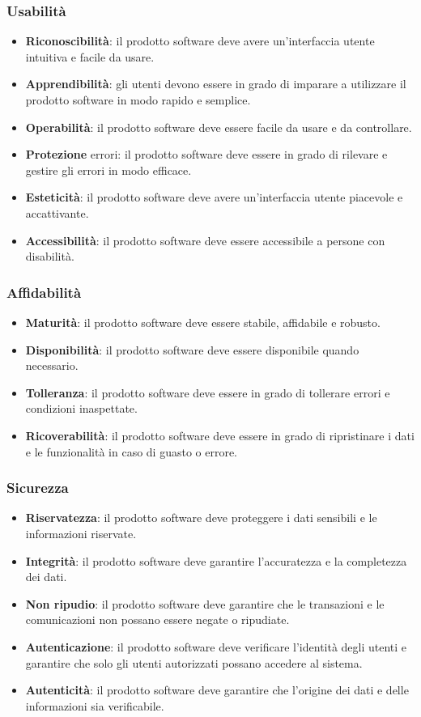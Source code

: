\subsubsection{Usabilità}
\begin{itemize}
    \item \textbf{Riconoscibilità}: il prodotto software deve avere un'interfaccia utente intuitiva e facile da usare.
    \item \textbf{Apprendibilità}: gli utenti devono essere in grado di imparare a utilizzare il prodotto software in modo rapido e semplice.
    \item \textbf{Operabilità}: il prodotto software deve essere facile da usare e da controllare.
    \item \textbf{Protezione} errori: il prodotto software deve essere in grado di rilevare e gestire gli errori in modo efficace.
    \item \textbf{Esteticità}: il prodotto software deve avere un'interfaccia utente piacevole e accattivante.
    \item \textbf{Accessibilità}: il prodotto software deve essere accessibile a persone con disabilità.
\end{itemize}
\subsubsection{Affidabilità}
\begin{itemize}
    \item \textbf{Maturità}: il prodotto software deve essere stabile, affidabile e robusto.
    \item \textbf{Disponibilità}: il prodotto software deve essere disponibile quando necessario.
    \item \textbf{Tolleranza}: il prodotto software deve essere in grado di tollerare errori e condizioni inaspettate.
    \item \textbf{Ricoverabilità}: il prodotto software deve essere in grado di ripristinare i dati e le funzionalità in caso di guasto o errore.
\end{itemize}
\subsubsection{Sicurezza}
\begin{itemize}
    \item \textbf{Riservatezza}: il prodotto software deve proteggere i dati sensibili e le informazioni riservate.
    \item \textbf{Integrità}: il prodotto software deve garantire l'accuratezza e la completezza dei dati.
    \item \textbf{Non ripudio}: il prodotto software deve garantire che le transazioni e le comunicazioni non possano essere negate o ripudiate.
    \item \textbf{Autenticazione}: il prodotto software deve verificare l'identità degli utenti e garantire che solo gli utenti autorizzati possano accedere al sistema.
    \item \textbf{Autenticità}: il prodotto software deve garantire che l'origine dei dati e delle informazioni sia verificabile.
\end{itemize}

